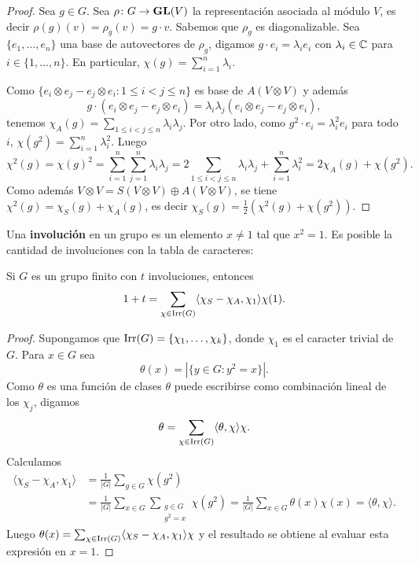 \begin{proof}
    Sea $g\in G$. Sea $\rho\colon G\to\mathbf{GL}(V)$ la representación asociada al módulo $V$, es decir $\rho(g)(v)=\rho_g(v)=g\cdot v$. 
    Sabemos que $\rho_g$ es diagonalizable. Sea $\{e_1,\dots,e_n\}$ una base de autovectores de $\rho_g$, digamos
    $g\cdot e_i=\lambda_ie_i$ con $\lambda_i\in\mathbb{C}$ para $i\in\{1,\dots,n\}$. En particular, $\chi(g)=\sum_{i=1}^n\lambda_i$. 
    
    Como $\{e_i\otimes e_j-e_j\otimes e_i:1\leq i<j\leq n\}$ es base de $A(V\otimes V)$ y además 
    \[
    g\cdot (e_i\otimes e_j-e_j\otimes e_i)=\lambda_i\lambda_j(e_i\otimes e_j-e_j\otimes e_i),
    \]
    tenemos $\chi_A(g)=\sum_{1\leq i<j\leq n}\lambda_i\lambda_j$. Por otro lado, como $g^2\cdot e_i=\lambda_i^2e_i$ para todo $i$,
    $\chi(g^2)=\sum_{i=1}^n\lambda_i^2$. Luego
    \[
    \chi^2(g)=\chi(g)^2=\sum_{i=1}^n\sum_{j=1}^n\lambda_i\lambda_j=2\sum_{1\leq i<j\leq n}\lambda_i\lambda_j+\sum_{i=1}^n\lambda_i^2=2\chi_A(g)+\chi(g^2).
    \]
    Como además $V\otimes V=S(V\otimes V)\oplus A(V\otimes V)$, se tiene 
    $\chi^2(g)=\chi_S(g)+\chi_A(g)$, es decir 
    $\chi_S(g)=\frac12(\chi^2(g)+\chi(g^2))$.
\end{proof}

Una \textbf{involución} en un grupo es un elemento $x\ne 1$ tal que $x^2=1$. 
Es posible la cantidad de involuciones 
con la tabla de caracteres:

\begin{proposition}
Si $G$ es un grupo finito con $t$ involuciones, entonces 
\[
1+t=\sum_{\chi\in\operatorname{Irr}(G)}\langle\chi_S-\chi_A,\chi_1\rangle\chi(1).
\]
\end{proposition}

\begin{proof}
Supongamos que $\operatorname{Irr}(G)=\{\chi_1,\dots,\chi_k\}$, donde $\chi_1$ es el caracter trivial de $G$. 
Para $x\in G$ sea 
\[
\theta(x)=|\{y\in G:y^2=x\}|.
\]
Como $\theta$ es una función de clases
$\theta$ puede escribirse como combinación lineal de los $\chi_j$, digamos
\[
\theta=\sum_{\chi\in\operatorname{Irr}(G)}\langle\theta,\chi\rangle\chi.
\]
Calculamos
\begin{align*}
    \langle\chi_S-\chi_A,\chi_1\rangle 
    &=\frac{1}{|G|}\sum_{g\in G}\chi(g^2)\\
    &=\frac{1}{|G|}\sum_{x\in G}\sum_{\substack{g\in G\\g^2=x}}\chi(g^2)
    =\frac{1}{|G|}\sum_{x\in G}\theta(x)\chi(x)=\langle\theta,\chi\rangle.
\end{align*}
Luego $\theta(x)=\sum_{\chi\in\operatorname{Irr}(G)}\langle\chi_S-\chi_A,\chi_1\rangle\chi$ y el resultado se obtiene
al evaluar esta expresión en $x=1$. 
\end{proof}

